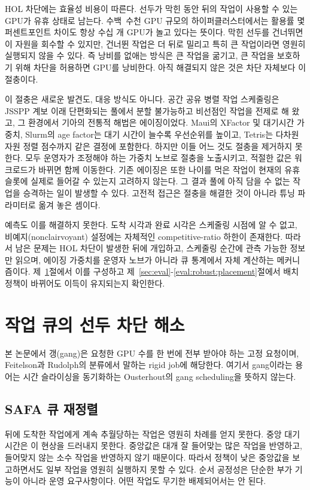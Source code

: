 \documentclass{ieeetj}
\begin{document}
HOL 차단에는 효율성 비용이 따른다. 선두가 막힌 동안 뒤의 작업이 사용할 수 있는 GPU가 유휴 상태로 남는다. 수백~수천 GPU 규모의 하이퍼클러스터에서는 활용률 몇 퍼센트포인트 차이도 항상 수십 개 GPU가 놀고 있다는 뜻이다. 막힌 선두를 건너뛰면 이 자원을 회수할 수 있지만, 건너뛴 작업은 더 뒤로 밀리고 특히 큰 작업이라면 영원히 실행되지 않을 수 있다. 즉 낭비를 없애는 방식은 큰 작업을 굶기고, 큰 작업을 보호하기 위해 차단을 허용하면 GPU를 낭비한다. 아직 해결되지 않은 것은 차단 자체보다 이 절충이다.

이 절충은 새로운 발견도, 대응 방식도 아니다. 공간 공유 병렬 작업 스케줄링은 JSSPP 계보\cite{feitelson1996toward} 이래 단편화되는 풀에서 분할 불가능하고 비선점인 작업을 전제로 해 왔고, 그 환경에서 기아의 전통적 해법은 에이징이었다. Maui의 XFactor 및 대기시간 가중치\cite{jackson2001maui}, Slurm의 age factor는 대기 시간이 늘수록 우선순위를 높이고, Tetris\cite{grandl2014multi}는 다차원 자원 정렬 점수까지 같은 결정에 포함한다. 하지만 이들 어느 것도 절충을 제거하지 못한다. 모두 운영자가 조정해야 하는 가중치 노브로 절충을 노출시키고, 적절한 값은 워크로드가 바뀌면 함께 이동한다. 기존 에이징은 또한 나이를 먹은 작업이 현재의 유휴 슬롯에 실제로 들어갈 수 있는지 고려하지 않는다. 그 결과 풀에 아직 담을 수 없는 작업을 승격하는 일이 발생할 수 있다. 고전적 접근은 절충을 해결한 것이 아니라 튜닝 파라미터로 옮겨 놓은 셈이다.

예측도 이를 해결하지 못한다. 도착 시각과 완료 시각은 스케줄링 시점에 알 수 없고, 비예지(nonclairvoyant) 설정에는 자체적인 competitive-ratio 하한이 존재한다\cite{motwani1994nonclairvoyant}. 따라서 남은 문제는 HOL 차단이 발생한 뒤에 개입하고, 스케줄링 순간에 관측 가능한 정보만 읽으며, 에이징 가중치를 운영자 노브가 아니라 큐 통계에서 자체 계산하는 메커니즘이다. 제~\ref{algo:intro}절에서 이를 구성하고 제~\ref{sec:eval}-\ref{eval:robust:placement}절에서 배치 정책이 바뀌어도 이득이 유지되는지 확인한다.

\section{작업 큐의 선두 차단 해소}\label{algo:intro}
본 논문에서 갱(gang)은 요청한 GPU 수를 한 번에 전부 받아야 하는 고정 요청이며, Feitelson과 Rudolph의 분류\cite{feitelson1996toward}에서 말하는 rigid job에 해당한다. 여기서 gang이라는 용어는 시간 슬라이싱을 동기화하는 Ousterhout의 gang scheduling\cite{ousterhout1982gang}을 뜻하지 않는다.

\subsection{SAFA 큐 재정렬}
뒤에 도착한 작업에게 계속 추월당하는 작업은 영원히 차례를 얻지 못한다. 중앙 대기시간은 이 현상을 드러내지 못한다. 중앙값은 대개 잘 들어맞는 많은 작업을 반영하고, 들어맞지 않는 소수 작업을 반영하지 않기 때문이다. 따라서 정책이 낮은 중앙값을 보고하면서도 일부 작업을 영원히 실행하지 못할 수 있다. 순서 공정성은 단순한 부가 기능이 아니라 운영 요구사항이다. 어떤 작업도 무기한 배제되어서는 안 된다.
\end{document}
